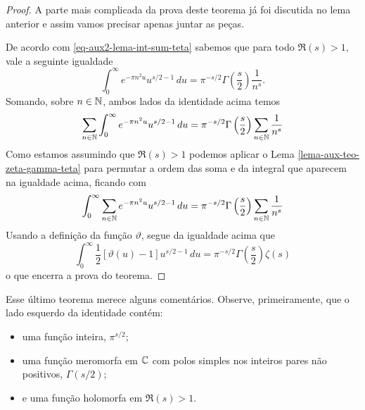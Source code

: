     \begin{proof}
    A parte mais complicada da prova deste teorema já foi discutida no lema anterior e assim vamos precisar apenas juntar as peças.    
    
    De acordo com \eqref{eq-aux2-lema-int-sum-teta} 
    sabemos que para todo $\Re(s)>1$, 
    vale a seguinte igualdade %
        \[
            \int_0^{\infty} e^{-\pi n^2u}u^{s/2 - 1} \, du
            = \pi^{-s/2}\Gamma\left( \frac{s}{2} \right)\frac{1}{n^s}.
        \]
        Somando, sobre $n\in\mathbb{N}$, ambos lados da identidade acima temos
        \[
            \sum_{n\in\mathbb{N}} \int_0^{\infty} e^{-\pi n^2u}u^{s/2 - 1} \, du
            = 
            \displaystyle\pi^{-s/2}\Gamma\left( \frac{s}{2} \right)\sum_{n\in\mathbb{N}}\frac{1}{n^s} 
        \]
        Como estamos assumindo que $\Re(s)>1$ 
        podemos aplicar o Lema \ref{lema-aux-teo-zeta-gamma-teta}
        para permutar a ordem das soma e da integral
        que aparecem na igualdade acima, ficando com 
        \[
            \int_0^{\infty}
            \sum_{n\in\mathbb{N}} 
            e^{-\pi n^2u}u^{s/2 - 1} \, du
            = 
            \displaystyle\pi^{-s/2}\Gamma\left( \frac{s}{2} \right)\sum_{n\in\mathbb{N}}\frac{1}{n^s} 
        \]
Usando a definição da função $\vartheta$, segue da igualdade acima que 
%
        \[
        \int_0^{\infty} \frac{1}{2}[\vartheta(u) - 1] u^{s/2 - 1} \, du
        = 
        \displaystyle
        \pi^{-s/2}\Gamma\left( \frac{s}{2} \right)\zeta(s)
        \]
o que encerra a prova do teorema.
    \end{proof}
    
    \bigskip 
    
    
    Esse último teorema merece alguns comentários. 
    Observe, primeiramente, que o lado esquerdo
    da identidade contém: 
    \begin{itemize}
        \item uma função inteira, $\pi^{s/2}$;
        
    \item uma função meromorfa em $\mathbb{C}$ com
    polos simples nos inteiros pares não positivos, $\Gamma(s/2)$;
    
    \item e uma função holomorfa em $\Re(s) > 1$.
    
    \end{itemize}
    
